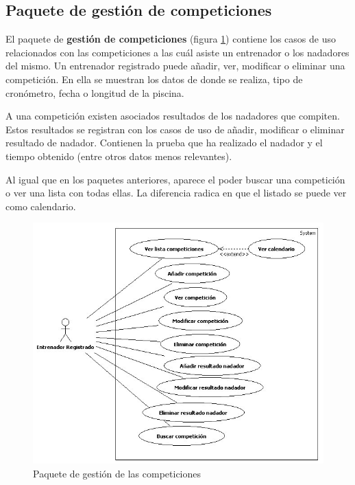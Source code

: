 
	\subsection{Paquete de gestión de competiciones} %
		\label{sub:paquete_de_gestion_de_competiciones}
		
		El paquete de {\bf gestión de competiciones} (figura \ref{fig:analisis_gestion_competiciones}) contiene los casos de uso relacionados con las competiciones a las cuál asiste un entrenador o los nadadores del mismo. Un entrenador registrado puede añadir, ver, modificar o eliminar una competición. En ella se muestran los datos de donde se realiza, tipo de cronómetro, fecha o longitud de la piscina.
		
		A una competición existen asociados resultados de los nadadores que compiten. Estos resultados se registran con los casos de uso de añadir, modificar o eliminar resultado de nadador. Contienen la prueba que ha realizado el nadador y el tiempo obtenido (entre otros datos menos relevantes).
		
		Al igual que en los paquetes anteriores, aparece el poder buscar una competición o ver una lista con todas ellas. La diferencia radica en que el listado se puede ver como calendario.
		
		\begin{figure}[H]
		  \centering
		    \includegraphics[width=15cm]{./eps/casos_uso/gestion_competiciones.eps}
		  \caption{Paquete de gestión de las competiciones}
		  \label{fig:analisis_gestion_competiciones}
		\end{figure}
		
